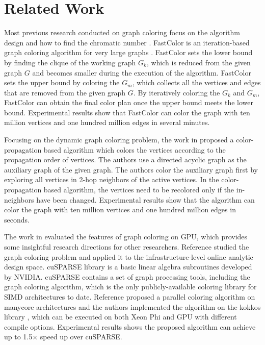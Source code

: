 \section{Related Work}
\label{relatework}
Most previous research conducted on graph coloring 
focus on the algorithm design and how to find the chromatic 
number \cite{topc,cor}. FastColor is an iteration-based graph 
coloring algorithm for very large graphs \cite{ijcai-17}. FastColor 
sets the lower bound by finding the clique of the working graph $G_k$, which is reduced from the given graph $G$ and becomes smaller during the 
execution of the algorithm. FastColor sets the upper bound by coloring the $G_m$, which 
collects all the vertices and edges that are removed from the given graph 
$G$. By iteratively coloring the $G_k$ and $G_m$, FastColor can obtain the 
final color plan once the upper bound meets the lower bound. Experimental 
results show that FastColor can color the graph with ten million vertices 
and one hundred million edges in several minutes. 

Focusing on the dynamic graph coloring problem, the work in \cite{vldbcolor} proposed a 
color-propagation based algorithm which colors the vertices according to 
the propagation order of vertices. The authors use a directed acyclic graph as 
the auxiliary graph of the given graph. The authors color the auxiliary graph 
first by exploring all vertices in 2-hop neighbors of the active 
vertices. In the color-propagation based algorithm, the vertices need to be 
recolored only if the in-neighbors have been changed. Experimental results 
show that the algorithm can color the graph with ten million vertices 
and one hundred million edges in seconds. 

The work in \cite{ppopp-11} evaluated the features of graph coloring on GPU, which provides some insightful
research directions for other researchers. Reference \cite{sc-16} studied the graph coloring problem and applied it to the infrastructure-level 
online analytic design space. cuSPARSE library \cite{nvidiaTR} is a basic linear 
algebra subroutines developed by NVIDIA. cuSPARSE contains a set of graph processing tools, including the graph coloring algorithm, which is the only 
publicly-available coloring library for SIMD architectures to date. 
Reference \cite{Manycore} proposed a parallel coloring 
algorithm on manycore architectures and the authors implemented the algorithm 
on the kokkos library \cite{kokkos}, which can be executed on both Xeon Phi and 
GPU with different compile options. Experimental results shows the proposed 
algorithm can achieve up to 1.5$\times$ speed up over cuSPARSE.